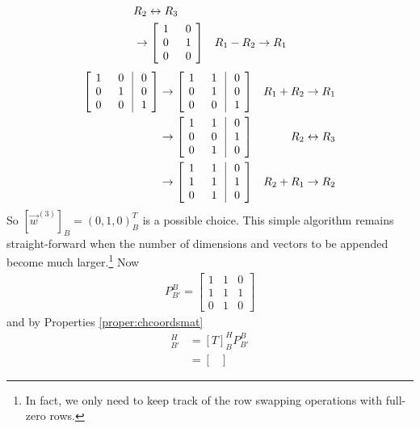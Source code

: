 \begin{solution}
\begin{align*}
& R_2 \leftrightarrow R_3 \\
&\to \left[\begin{array}{@{\,}wc{10pt}wc{10pt}@{\,}}
1 & 0 \\
0 & 1 \\
0 & 0
\end{array}\right]
& R_1 - R_2 \to R_1
\end{align*}
\begin{align*}
\left[\begin{array}{@{\,}wc{10pt}wc{10pt}|wc{10pt}@{\,}}
1 & 0 & 0 \\
0 & 1 & 0 \\
0 & 0 & 1
\end{array}\right] &\to
\left[\begin{array}{@{\,}wc{10pt}wc{10pt}|wc{10pt}@{\,}}
1 & 1 & 0 \\
0 & 1 & 0 \\
0 & 0 & 1
\end{array}\right]
& R_1 + R_2 \to R_1 \\
&\to \left[\begin{array}{@{\,}wc{10pt}wc{10pt}|wc{10pt}@{\,}}
1 & 1 & 0 \\
0 & 0 & 1 \\
0 & 1 & 0
\end{array}\right]
& R_2 \leftrightarrow R_3 \\
&\to \left[\begin{array}{@{\,}wc{10pt}wc{10pt}|wc{10pt}@{\,}}
1 & 1 & 0 \\
1 & 1 & 1 \\
0 & 1 & 0
\end{array}\right]
& R_2 + R_1 \to R_2
\end{align*}
So $[\vec{w}^{(3)}]_B = (0,1,0)_B^T$ is a possible choice. This simple algorithm remains straight-forward when the number of dimensions and vectors to be appended become much larger.\footnote{In fact, we only need to keep track of the row swapping operations with full-zero rows.} Now
\begin{align*}
P_{B'}^B = 
\begin{bmatrix}
1 & 1 & 0 \\
1 & 1 & 1 \\
0 & 1 & 0
\end{bmatrix}
\end{align*}
and by Properties \ref{proper:chcoordsmat}
\begin{align*}
[T]_{B'}^H &= [T]_B^H P_{B'}^B \\
&= \begin{bmatrix}

\end{bmatrix}
\end{align*}
\end{solution}
